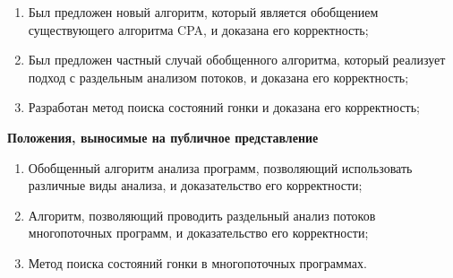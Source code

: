 {\novelty}
\begin{enumerate}
  \item Был предложен новый алгоритм, который является обобщением существующего алгоритма CPA, и доказана его корректность;
  \item Был предложен частный случай обобщенного алгоритма, который реализует подход с раздельным анализом потоков, и доказана его корректность;
  \item Разработан метод поиска состояний гонки и доказана его корректность;
\end{enumerate}



\textbf{Положения, выносимые на публичное представление}
\begin{enumerate}
  \item Обобщенный алгоритм анализа программ, позволяющий использовать различные виды анализа, и доказательство его корректности;
  \item Алгоритм, позволяющий проводить раздельный анализ потоков многопоточных программ, и доказательство его корректности;
  \item Метод поиска состояний гонки в многопоточных программах.
\end{enumerate}



